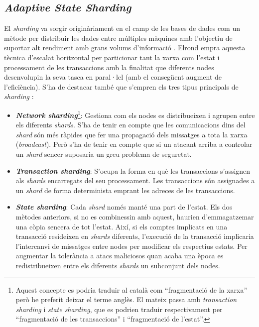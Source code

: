 \documentclass[11pt,a4paper]{article}
\begin{document}
\subsection{\textit{Adaptive State Sharding}}
El \textit{sharding} va sorgir originàriament en el camp de les bases de dades com un mètode per distribuir les dades entre múltiples màquines amb l'objectiu de suportar alt rendiment amb grans volums d'informació \cite{mongodb2021}. Elrond empra aquesta tècnica d'escalat horitzontal per particionar tant la xarxa com l'estat i processament de les transaccions amb la finalitat que diferents nodes desenvolupin la seva tasca en paral·lel (amb el consegüent augment de l'eficiència). S'ha de destacar també que s'empren els tres tipus principals de \textit{sharding} \cite{elrond2022}:

\begin{itemize}
	\item \textbf{\textit{Network sharding}}\footnote{Aquest concepte es podria traduir al català com ``fragmentació de la xarxa'' però he preferit deixar el terme anglès. El mateix passa amb \textit{transaction sharding} i \textit{state sharding}, que es podrien traduir respectivament per ``fragmentació de les transaccions'' i ``fragmentació de l'estat''.}: Gestiona com els nodes es distribueixen i agrupen entre els diferents \textit{shards}. S'ha de tenir en compte que les comunicacions dins del \textit{shard} són més ràpides que fer una propagació dels missatges a tota la xarxa (\textit{broadcast}). Però s'ha de tenir en compte que si un atacant arriba a controlar un \textit{shard} sencer suposaria un greu problema de seguretat. 
	\item \textbf{\textit{Transaction sharding}}: S'ocupa la forma en què les transaccions s'assignen als \textit{shards} encarregats del seu processament. Les transaccions són assignades a un \textit{shard} de forma determinista emprant les adreces de les transaccions.
	\item \textbf{\textit{State sharding}}: Cada \textit{shard} només manté una part de l'estat. Els dos mètodes anteriors, si no es combinessin amb aquest, haurien d'emmagatzemar una còpia sencera de tot l'estat. Així, si els comptes implicats en una transacció resideixen en \textit{shards} diferents, l'execució de la transacció implicaria l'intercanvi de missatges entre nodes per modificar els respectius estats. Per augmentar la tolerància a atacs maliciosos quan acaba una època es redistribueixen entre els diferents \textit{shards} un subconjunt dels nodes.
\end{itemize}
\end{document}
